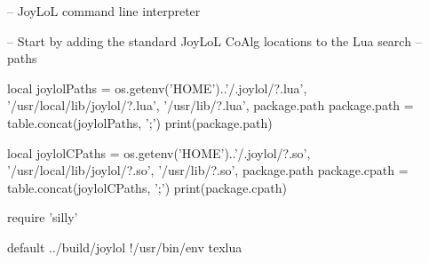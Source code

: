 
\startchapter[title=Preamble]

\startLuaCode
-- JoyLoL command line interpreter 

-- Start by adding the standard JoyLoL CoAlg locations to the Lua search 
-- paths 

local joylolPaths = {
  os.getenv('HOME')..'/.joylol/?.lua',
  '/usr/local/lib/joylol/?.lua',
  '/usr/lib/?.lua',
  package.path
}
package.path = table.concat(joylolPaths, ';')
print(package.path)

local joylolCPaths = {
  os.getenv('HOME')..'/.joylol/?.so',
  '/usr/local/lib/joylol/?.so',
  '/usr/lib/?.so',
  package.path
}
package.cpath = table.concat(joylolCPaths, ';')
print(package.cpath)

require 'silly'
\stopLuaCode

\createLuaCodeFile%
  {default}%
  {../build/joylol}%
  {!/usr/bin/env texlua}
  
\stopchapter